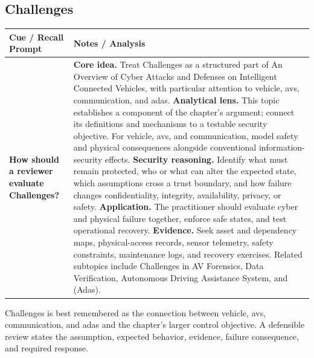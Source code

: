 \documentclass[11pt]{article}
\newcommand{\CornellHeader}{%
\rowcolor{Navy}\color{white}\bfseries Cue / Recall Prompt & \color{white}\bfseries Notes / Analysis\\\hline}
\newcommand{\CornellRow}[2]{%
\cellcolor{CueGray}\RaggedRight\textbf{#1} & \RaggedRight #2\\\hline}
\begin{document}
\subsection*{Challenges}
\begin{longtable}{>{\RaggedRight\arraybackslash}p{}|>{\RaggedRight\arraybackslash}p{}}
\CornellHeader
\CornellRow{How should a reviewer evaluate Challenges?}{\textbf{Core idea.} Treat Challenges as a structured part of An Overview of Cyber Attacks and Defenses on Intelligent Connected Vehicles, with particular attention to vehicle, avs, communication, and adas. \textbf{Analytical lens.} This topic establishes a component of the chapter's argument; connect its definitions and mechanisms to a testable security objective. For vehicle, avs, and communication, model safety and physical consequences alongside conventional information-security effects. \textbf{Security reasoning.} Identify what must remain protected, who or what can alter the expected state, which assumptions cross a trust boundary, and how failure changes confidentiality, integrity, availability, privacy, or safety. \textbf{Application.} The practitioner should evaluate cyber and physical failure together, enforce safe states, and test operational recovery. \textbf{Evidence.} Seek asset and dependency maps, physical-access records, sensor telemetry, safety constraints, maintenance logs, and recovery exercises. Related subtopics include Challenges in AV Forensics, Data Verification, Autonomous Driving Assistance System, and (Adas).}
\end{longtable}
\begin{topicsummary}
Challenges is best remembered as the connection between vehicle, avs, communication, and adas and the chapter's larger control objective. A defensible review states the assumption, expected behavior, evidence, failure consequence, and required response.
\end{topicsummary}
\end{document}
